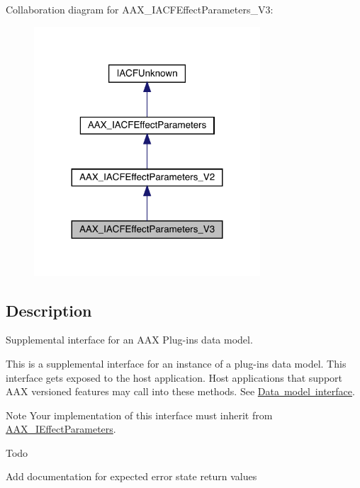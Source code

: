 Collaboration diagram for A\+A\+X\+\_\+\+I\+A\+C\+F\+Effect\+Parameters\+\_\+\+V3\+:
\nopagebreak
\begin{figure}[H]
\begin{center}
\leavevmode
\includegraphics[width=239pt]{a01679}
\end{center}
\end{figure}


\subsection{Description}
Supplemental interface for an A\+AX Plug-\/in\textquotesingle{}s data model. 

This is a supplemental interface for an instance of a plug-\/in\textquotesingle{}s data model. This interface gets exposed to the host application. Host applications that support A\+AX versioned features may call into these methods. See \mbox{\hyperlink{a00798}{Data model interface}}.

\begin{DoxyNote}{Note}
Your implementation of this interface must inherit from \mbox{\hyperlink{a01825}{A\+A\+X\+\_\+\+I\+Effect\+Parameters}}.
\end{DoxyNote}
\begin{DoxyRefDesc}{Todo}
\item[\mbox{\hyperlink{a00785__todo000033}{Todo}}]Add documentation for expected error state return values\end{DoxyRefDesc}
